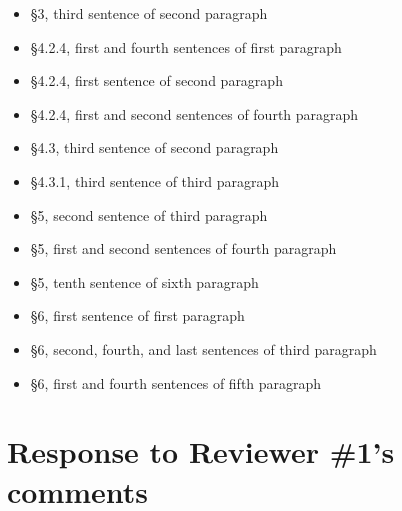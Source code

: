 \documentclass[11pt,letterpaper]{report}
\begin{document}
\begin{enumerate}[label=\textit{Mc.\arabic*}]
\begin{enumerate}[label=\textit{Mc.4.\roman*}]
\begin{itemize}
        \item \S3, third sentence of second paragraph
        \item \S4.2.4, first and fourth sentences of first paragraph
        \item \S4.2.4, first sentence of second paragraph
        \item \S4.2.4, first and second sentences of fourth paragraph
        \item \S4.3, third sentence of second paragraph
        \item \S4.3.1, third sentence of third paragraph
        \item \S5, second sentence of third paragraph
        \item \S5, first and second sentences of fourth paragraph
        \item \S5, tenth sentence of sixth paragraph
        \item \S6, first sentence of first paragraph
        \item \S6, second, fourth, and last sentences of third paragraph
        \item \S6, first and fourth sentences of fifth paragraph

    \end{itemize}

\end{enumerate}


\end{enumerate}

\clearpage
\section*{Response to Reviewer \#1's comments}
\label{rev1}
\end{document}

